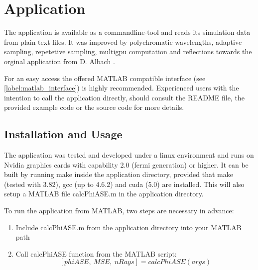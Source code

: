 \section{Application}

The application is available as a commandline-tool and reads
its simulation data from plain text files. It was improved by polychromatic
wavelengths, adaptive sampling, repetetive sampling, multigpu computation and 
reflections towards the orginal application from D. Albach \cite{ASE2010}.

For an easy access the offered MATLAB compatible interface (see \ref{label:matlab_interface}) 
is highly recommended. Experienced users with the intention to call the application
directly, should consult the README file, the provided 
example code or the source code for more details.

\subsection{Installation and Usage}
The application was tested and developed under a linux environment
and runs on Nvidia graphics cards with capability 2.0 (fermi generation) or higher.
It can be built by running make inside the application directory, provided
that make (tested with 3.82), gcc (up to 4.6.2) and cuda (5.0) are installed. 
This will also setup a MATLAB file calcPhiASE.m in the application
directory. 

To run the application from MATLAB, two steps are
necessary in advance:
\begin{enumerate}
  \label{label:matlab_interface}
  \item Include calcPhiASE.m from the application directory into your MATLAB path
  \item Call calcPhiASE function from the MATLAB script: \[[phiASE,~MSE,~nRays] = calcPhiASE(args)\]
\end{enumerate}

